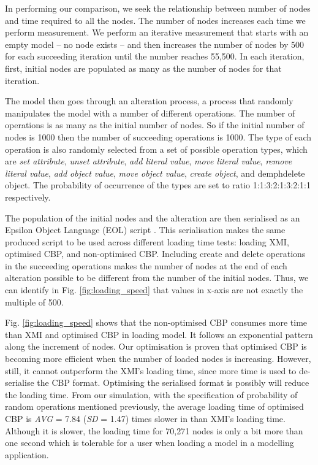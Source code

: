 \documentclass{llncs}
\begin{document}
{In performing our comparison, we seek the relationship between number of nodes and time required to all the nodes. The number of nodes increases each time we perform measurement. We perform an iterative measurement that starts with an empty model -- no node exists -- and then increases the number of nodes by 500 for each succeeding iteration until the number reaches 55,500. In each iteration, first, initial nodes are populated as many as the number of nodes for that iteration. 

The model then goes through an alteration process, a process that randomly manipulates the model with a number of different operations. The number of operations is as many as the initial number of nodes. So if the initial number of nodes is 1000 then the number of succeeding operations is 1000. The type of each operation is also randomly selected from a set of possible operation types, which are \emph{set attribute}, \emph{unset attribute}, \emph{add literal value}, \emph{move literal value}, \emph{remove literal value}, \emph{add object value}, \emph{move object value}, \emph{create object}, and demph{delete object}. The probability of occurrence of the types are set to ratio 1:1:3:2:1:3:2:1:1 respectively. 

The population of the initial nodes and the alteration are then serialised as an Epsilon Object Language (EOL) script \cite{kolovos2006epsilon}. This serialisation makes the same produced script to be used across different loading time tests: loading XMI, optimised CBP, and non-optimised CBP. Including create and delete operations in the succeeding operations makes the number of nodes at the end of each alteration possible to be different from the number of the initial nodes. Thus, we can identify in Fig. \ref{fig:loading_speed} that values in x-axis are not exactly the multiple of 500.    

Fig. \ref{fig:loading_speed} shows that the non-optimised CBP consumes more time than XMI and optimised CBP in loading model. It follows an exponential pattern along the increment of nodes. Our optimisation is proven that optimised CBP is becoming more efficient when the number of loaded nodes is increasing. However, still, it cannot outperform the XMI's loading time, since more time is used to de-serialise the CBP format. Optimising the serialised format is possibly will reduce the loading time. From our simulation, with the specification of probability of random operations mentioned previously, the average loading time of optimised CBP is \emph{AVG} = 7.84 (\emph{SD} = 1.47) times slower in than XMI's loading time. Although it is slower, the loading time for 70,271 nodes is only a bit more than one second which is tolerable for a user when loading a model in a modelling application. 

}
\end{document}
